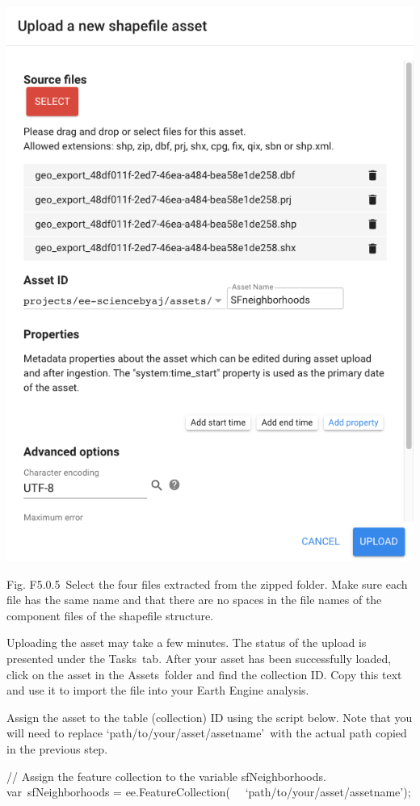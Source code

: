 \documentclass[
  letterpaper,
  DIV=11,
  numbers=noendperiod]{scrreprt}
\begin{document}
\includegraphics{./F5/image43.png}

Fig. F5.0.5~Select the four files extracted from the zipped folder. Make
sure each file has the same name and that there are no spaces in the
file names of the component files of the shapefile structure.

Uploading the asset may take a few minutes. The status of the upload is
presented under the Tasks~tab. After your asset has been successfully
loaded, click on the asset in the Assets~folder and find the collection
ID. Copy this text and use it to import the file into your Earth Engine
analysis.

Assign the asset to the table (collection) ID using the script below.
Note that you will need to replace `path/to/your/asset/assetname'~with
the actual path copied in the previous step.

// Assign the feature collection to the variable sfNeighborhoods.\\
var~sfNeighborhoods = ee.FeatureCollection(~
~`path/to/your/asset/assetname');
\end{document}
